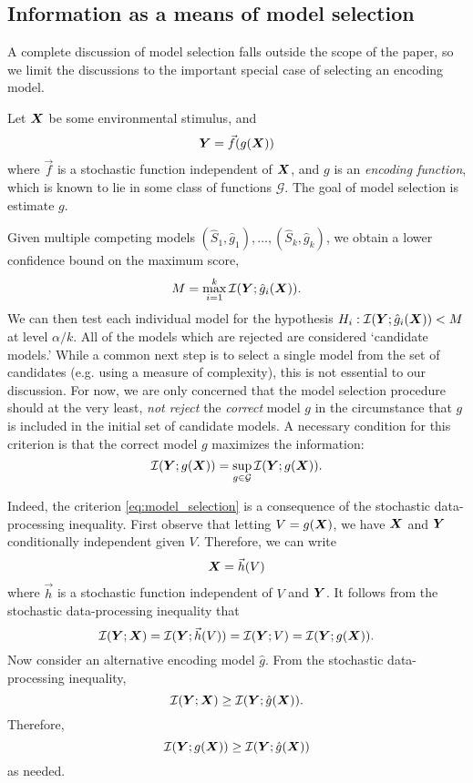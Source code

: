 \documentclass[12pt]{article}
\begin{document}
\subsection{Information as a means of model selection}

A complete discussion of model selection falls outside the scope of
the paper, so we limit the discussions to the important special case
of selecting an encoding model.

Let $\boldsymbol{X}$ be some environmental stimulus, and
\[
\boldsymbol{Y} = \vec{f}(g(\boldsymbol{X}))
\]
where $\vec{f}$ is a stochastic function independent of $\boldsymbol{X}$, and $g$ is
an \emph{encoding function}, which is known to lie in some class of
functions $\mathcal{G}$.  The goal of model selection is estimate $g$.

Given multiple competing models $(\hat{S}_1, \hat{g}_1),\hdots,
(\hat{S}_k, \hat{g}_k)$, we obtain a lower confidence bound on the maximum score,
\[
M = \max_{i=1}^k \mathcal{I}(\boldsymbol{Y}; \hat{g}_i(\boldsymbol{X})).
\]
We can then test each individual model for the hypothesis
$H_i: \mathcal{I}(\boldsymbol{Y}; \hat{g}_i(\boldsymbol{X})) < M$ at level $\alpha/k$.  All of the models which
are rejected are considered `candidate models.'  While a common next
step is to select a single model from the set of candidates
(e.g. using a measure of complexity), this is not essential to our
discussion.  For now, we are only concerned that the model selection
procedure should at the very least, \emph{not reject}
the \emph{correct} model $g$ in the circumstance that $g$ is included
in the initial set of candidate models.  A necessary condition for
this criterion is that the correct model $g$ maximizes the
information:
\begin{equation}\label{eq:model_selection}
\mathcal{I}(\boldsymbol{Y}; g(\boldsymbol{X})) = \sup_{g \in \mathcal{G}} \mathcal{I}(\boldsymbol{Y}; g(\boldsymbol{X})).
\end{equation}

Indeed, the criterion \eqref{eq:model_selection} is a consequence of
the stochastic data-processing inequality.  First observe that letting
$V = g(\boldsymbol{X})$, we have $\boldsymbol{X}$ and $\boldsymbol{Y}$ conditionally independent given
$V$.  Therefore, we can write
\[
\boldsymbol{X} = \vec{h}(V)
\]
where $\vec{h}$ is a stochastic function independent of $V$ and $\boldsymbol{Y}$.
It follows from the stochastic data-processing inequality that
\[
\mathcal{I}(\boldsymbol{Y}; \boldsymbol{X}) = \mathcal{I}(\boldsymbol{Y}; \vec{h}(V)) = \mathcal{I}(\boldsymbol{Y}; V) = \mathcal{I}(\boldsymbol{Y}; g(\boldsymbol{X})).
\]
Now consider an alternative encoding model $\hat{g}$.  From the stochastic data-processing inequality,
\[
\mathcal{I}(\boldsymbol{Y}; \boldsymbol{X}) \geq \mathcal{I}(\boldsymbol{Y}; \hat{g}(\boldsymbol{X})).
\]
Therefore,
\[
\mathcal{I}(\boldsymbol{Y}; g(\boldsymbol{X})) \geq \mathcal{I}(\boldsymbol{Y}; \hat{g}(\boldsymbol{X}))
\]
as needed.
\end{document}
